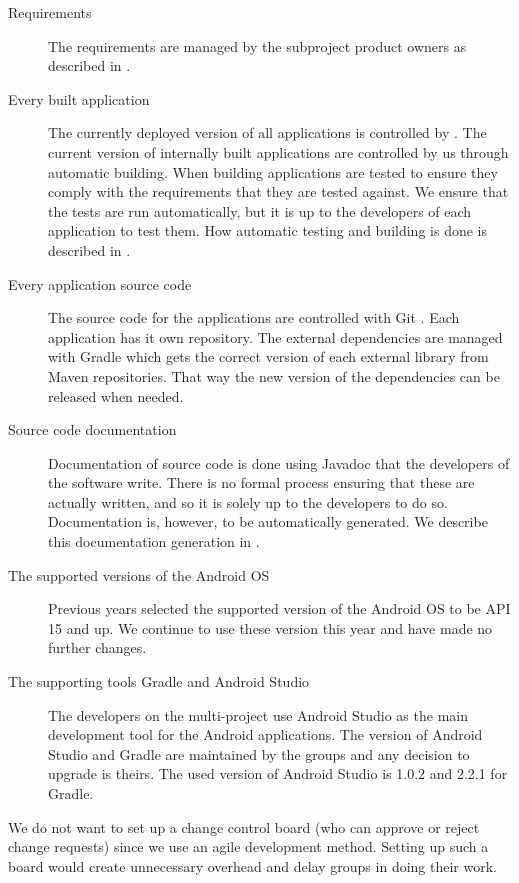 \begin{description}
  \item[Requirements] The requirements are managed by the subproject product owners as described in .
  \item[Every built application] The currently deployed version of all applications is controlled by . The current version of internally built applications are controlled by us through automatic building. When building applications are tested to ensure they comply with the requirements that they are tested against. We ensure that the tests are run automatically, but it is up to the developers of each application to test them. How automatic testing and building is done is described in .
  \item[Every application source code] The source code for the applications are controlled with Git \parencite{gitwebsite}. Each application has it own repository. The external dependencies are managed with Gradle which gets the correct version of each external library from Maven repositories. That way the new version of the dependencies can be released when needed.
  \item[Source code documentation] Documentation of source code is done using Javadoc that the developers of the software write. There is no formal process ensuring that these are actually written, and so it is solely up to the developers to do so. Documentation is, however, to be automatically generated. We describe this documentation generation in .
  \item[The supported versions of the Android OS] Previous years selected the supported version of the Android OS to be API 15 and up. We continue to use these version this year and have made no further changes.
  \item[The supporting tools Gradle and Android Studio] The developers on the multi-project use Android Studio as the main development tool for the Android applications. The version of Android Studio and Gradle are maintained by the \bd groups and any decision to upgrade is theirs. The used version of Android Studio is 1.0.2 and 2.2.1 for Gradle.
\end{description}

We do not want to set up a change control board (who can approve or reject change requests) since we use an agile development method. Setting up such a board would create unnecessary overhead and delay groups in doing their work.

